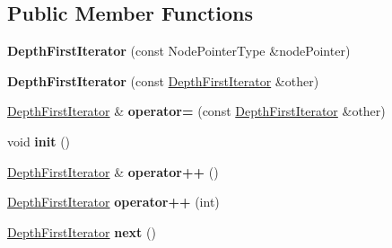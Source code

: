\subsection*{Public Member Functions}
\begin{DoxyCompactItemize}
\item 
\mbox{\label{classDepthFirstIterator_3_01NodePointerType_00_01false_01_4_a7f1728cad39452deb4f0d0ec3134a9f7}} 
{\bfseries Depth\+First\+Iterator} (const Node\+Pointer\+Type \&node\+Pointer)
\item 
\mbox{\label{classDepthFirstIterator_3_01NodePointerType_00_01false_01_4_ac76d766f0c5e0d1f20131b4b107d0e9e}} 
{\bfseries Depth\+First\+Iterator} (const \mbox{\hyperlink{classDepthFirstIterator}{Depth\+First\+Iterator}} \&other)
\item 
\mbox{\label{classDepthFirstIterator_3_01NodePointerType_00_01false_01_4_aaa64c77b53f3ce6e7060a95fc8a16d28}} 
\mbox{\hyperlink{classDepthFirstIterator}{Depth\+First\+Iterator}} \& {\bfseries operator=} (const \mbox{\hyperlink{classDepthFirstIterator}{Depth\+First\+Iterator}} \&other)
\item 
\mbox{\label{classDepthFirstIterator_3_01NodePointerType_00_01false_01_4_a45fecdb4a7454bd20e1323ca94696ed3}} 
void {\bfseries init} ()
\item 
\mbox{\label{classDepthFirstIterator_3_01NodePointerType_00_01false_01_4_a749d75ec84ebeb08e6df93c6974cf32d}} 
\mbox{\hyperlink{classDepthFirstIterator}{Depth\+First\+Iterator}} \& {\bfseries operator++} ()
\item 
\mbox{\label{classDepthFirstIterator_3_01NodePointerType_00_01false_01_4_a0a3062978d8cafb10d0087186f42e23f}} 
\mbox{\hyperlink{classDepthFirstIterator}{Depth\+First\+Iterator}} {\bfseries operator++} (int)
\item 
\mbox{\label{classDepthFirstIterator_3_01NodePointerType_00_01false_01_4_a4ed1780cbdcf2ad53139c86e04fe9160}} 
\mbox{\hyperlink{classDepthFirstIterator}{Depth\+First\+Iterator}} {\bfseries next} ()
\end{DoxyCompactItemize}
